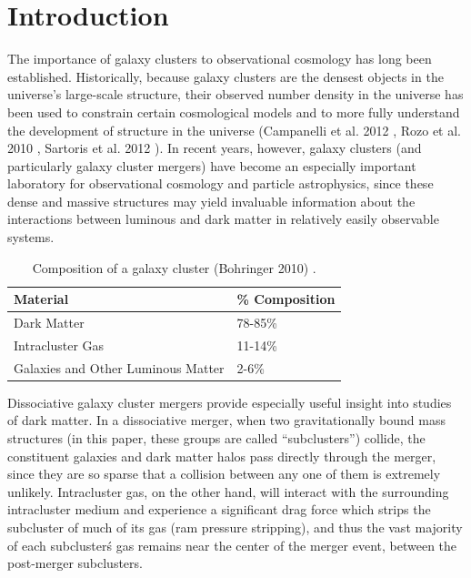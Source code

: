 \documentclass[12 pt]{article}
\renewcommand{\baselinestretch}{2}
\begin{document}
\newpage

\section{Introduction}

The importance of galaxy clusters to observational cosmology has long been established.  Historically, because galaxy clusters are the densest objects in the universe's large-scale structure, their observed number density in the universe has been used to constrain certain cosmological models and to more fully understand the development of structure in the universe (Campanelli et al. 2012 \cite{Campanelli12}, Rozo et al. 2010 \cite{Rozo10}, Sartoris et al. 2012 \cite{Sartoris12}). In recent years, however, galaxy clusters (and particularly galaxy cluster mergers) have become an especially important laboratory for observational cosmology and particle astrophysics, since these dense and massive structures may yield invaluable information about the interactions between luminous and dark matter in relatively easily observable systems. 

\begin{table}[h]
\centering
\begin{tabular}{|l|l|} \hline
Material & \% Composition \\ \hline
Dark Matter & 78-85\% \\
Intracluster Gas & 11-14\% \\
Galaxies and Other Luminous Matter & 2-6\% \\
\hline
\end{tabular}
\renewcommand{\baselinestretch}{1}
\caption{Composition of a galaxy cluster (Bohringer 2010) \cite{Bohringer10}.}
\label{tab1}
\end{table}

\renewcommand{\baselinestretch}{2}
Dissociative galaxy cluster mergers provide especially useful insight into studies of dark matter. In a dissociative merger, when two gravitationally bound mass structures (in this paper, these groups are called “subclusters”) collide, the constituent galaxies and dark matter halos pass directly through the merger, since they are so sparse that a collision between any one of them is extremely unlikely. Intracluster gas, on the other hand, will interact with the surrounding intracluster medium and experience a significant drag force which strips the subcluster of much of its gas (ram pressure stripping), and thus the vast majority of each subcluster\'s gas remains near the center of the merger event, between the post-merger subclusters.
\end{document}

